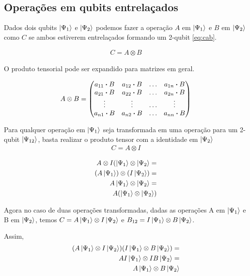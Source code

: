 \documentclass[a4paper, 12pt, oneside]{book}
\begin{document}
\subsection{Operações em qubits entrelaçados}

Dados dois qubits $\ket{\Psi_1}$ e $\ket{\Psi_2}$ podemos fazer a operação $A$ em $\ket{\Psi_1}$ e $B$ em $\ket{\Psi_2}$ como $C$ se ambos estiverem entrelaçados formando um 2-qubit \eqref{eq:cab}.

\begin{align} \label{eq:cab}
C = A \otimes B
\end{align}

O produto tensorial pode ser expandido para matrizes em geral.

\begin{align*}
A \otimes B = \mqty(a_{11}\vdot B & a_{12}\vdot B & \hdots & a_{1n}\vdot B \\
  a_{21}\vdot B & a_{22}\vdot B & \hdots & a_{2n}\vdot B \\
  \vdots & \vdots & \hdots & \vdots \\
  a_{n1}\vdot B & a_{n2}\vdot B & \hdots & a_{nn}\vdot B \\
)
\end{align*}

Para qualquer operação em $\ket{\Psi_1}$ seja transformada em uma operação para um 2-qubit $\ket{\Psi_{12}}$, basta realizar o produto tensor com a identidade em $\ket{\Psi_2}$ 
\begin{align} \label{eq:cai}
C = A \otimes I
\end{align}

\begin{align*}
A \otimes I (\ket{\Psi_1} \otimes \ket{\Psi_2} = \\
  (A\ket{\Psi_1}) \otimes (I\ket{\Psi_2}) = \\
  A\ket{\Psi_1} \otimes \ket{\Psi_2} = \\
  A(\ket{\Psi_1} \otimes \ket{\Psi_2})
\end{align*}

Agora no caso de duas operações transformadas, dadas as operações A em $\ket{\Psi_1}$ e B em $\ket{\Psi_2}$, temos $C = A\ket{\Psi_1} \otimes I\ket{\Psi_2}$ e $B_{12} = I\ket{\Psi_1} \otimes B\ket{\Psi_2}$.

Assim,
\begin{align*}
(A\ket{\Psi_1} \otimes I\ket{\Psi_2})(I\ket{\Psi_1} \otimes B\ket{\Psi_2}) = \\
AI\ket{\Psi_1} \otimes IB\ket{\Psi_2} = \\
A\ket{\Psi_1} \otimes B\ket{\Psi_2}
\end{align*}
\end{document}
